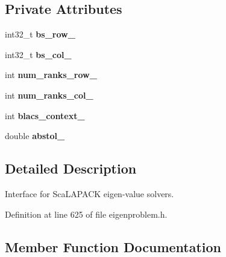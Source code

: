 \subsection*{Private Attributes}
\begin{DoxyCompactItemize}
\item 
\hypertarget{class_eigenproblem__scalapack_afd39a9432cecd17c5aeff9aac844094c}{}int32\+\_\+t {\bfseries bs\+\_\+row\+\_\+}\label{class_eigenproblem__scalapack_afd39a9432cecd17c5aeff9aac844094c}

\item 
\hypertarget{class_eigenproblem__scalapack_a164403fc08953e69bd7463711e4988bc}{}int32\+\_\+t {\bfseries bs\+\_\+col\+\_\+}\label{class_eigenproblem__scalapack_a164403fc08953e69bd7463711e4988bc}

\item 
\hypertarget{class_eigenproblem__scalapack_a2c7b3f41e0eef84c398606488ac75f2b}{}int {\bfseries num\+\_\+ranks\+\_\+row\+\_\+}\label{class_eigenproblem__scalapack_a2c7b3f41e0eef84c398606488ac75f2b}

\item 
\hypertarget{class_eigenproblem__scalapack_abce1085360c557ce1fd4e3b92bb595aa}{}int {\bfseries num\+\_\+ranks\+\_\+col\+\_\+}\label{class_eigenproblem__scalapack_abce1085360c557ce1fd4e3b92bb595aa}

\item 
\hypertarget{class_eigenproblem__scalapack_aa5f945fd3e8bd65cced45228f3abd2f9}{}int {\bfseries blacs\+\_\+context\+\_\+}\label{class_eigenproblem__scalapack_aa5f945fd3e8bd65cced45228f3abd2f9}

\item 
\hypertarget{class_eigenproblem__scalapack_a05fc23dbc625dde11957d86e1ced2d19}{}double {\bfseries abstol\+\_\+}\label{class_eigenproblem__scalapack_a05fc23dbc625dde11957d86e1ced2d19}

\end{DoxyCompactItemize}


\subsection{Detailed Description}
Interface for Sca\+L\+A\+P\+A\+C\+K eigen-\/value solvers. 

Definition at line 625 of file eigenproblem.\+h.



\subsection{Member Function Documentation}
\hypertarget{class_eigenproblem__scalapack_ac8d647129c61f4eb167e05967aee7fbd}{}

